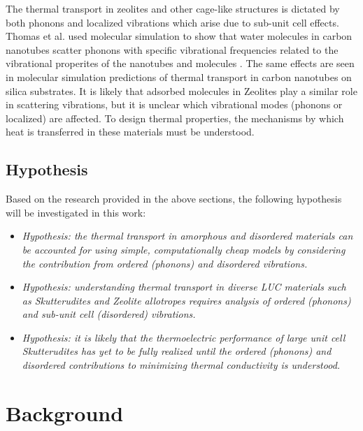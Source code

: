 \documentclass[letterpaper,12pt]{article}
\begin{document}
The thermal transport in zeolites and other cage-like structures is dictated by both phonons\cite{mcgaughey2004b} and localized vibrations which arise due to sub-unit cell effects.\cite{O'Keeffe20003,doi:10.1021/ar000034b} Thomas et al. used molecular simulation to show that water molecules in carbon nanotubes scatter phonons with specific vibrational frequencies related to the vibrational properites of the nanotubes and molecules \cite{thomas2010c}. The same effects are seen in molecular simulation predictions of thermal transport in carbon nanotubes on silica substrates.\cite{shiomi2011b} It is likely that adsorbed molecules in Zeolites play a similar role in scattering vibrations, but it is unclear which vibrational modes (phonons or localized) are affected.\cite{Miyamoto1994117} To design thermal properties, the mechanisms by which heat is transferred in these materials must be understood.

\subsection{\label{S-Motivation-Hypothesis}Hypothesis}


Based on the research provided in the above sections, the following hypothesis will be investigated in this work:

\begin{itemize}

\item \textit{Hypothesis: the thermal transport in amorphous and disordered materials can be accounted for using simple, computationally cheap models by considering the contribution from ordered (phonons) and disordered vibrations.}

\item \textit{Hypothesis: understanding thermal transport in diverse LUC materials such as Skutterudites and Zeolite allotropes requires analysis of ordered (phonons) and sub-unit cell (disordered) vibrations.}

\item \textit{Hypothesis: it is likely that the thermoelectric performance of large unit cell Skutterudites has yet to be fully realized until the ordered (phonons) and disordered contributions to minimizing thermal conductivity is understood.}

\end{itemize}

\clearpage


\section{\label{S-Back}Background}
\end{document}

